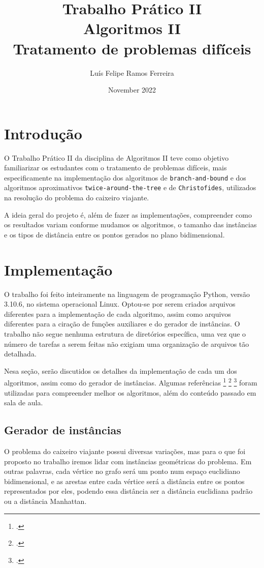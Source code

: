 \documentclass{article}
\author{Luís Felipe Ramos Ferreira }
\title{Trabalho Prático II \\ Algoritmos II \\ Tratamento de problemas difíceis}
\date{November 2022}
\begin{document}
\maketitle

\section{Introdução}

O Trabalho Prático II da disciplina de Algoritmos II teve como objetivo familiarizar os estudantes com o tratamento de problemas difíceis, mais especificamente na implementação dos algoritmos de \texttt{branch-and-bound} e dos algoritmos aproximativos \texttt{twice-around-the-tree} e de \texttt{Christofides}, utilizados na resolução do problema do caixeiro viajante.

A ideia geral do projeto é, além de fazer as implementações, compreender como os resultados variam conforme mudamos os algoritmos, o tamanho das instâncias e os tipos de distância entre os pontos gerados no plano bidimensional.

\section{Implementação}

O trabalho foi feito inteiramente na linguagem de programação Python, versão
3.10.6, no sistema operacional Linux.
Optou-se por serem criados arquivos diferentes para a implementação de cada algoritmo, assim como arquivos diferentes para a ciração de funções auxiliares e do gerador de instâncias. O trabalho não segue nenhuma estrutura de diretórios específica, uma vez que o número de tarefas a serem feitas não exigiam uma organização de arquivos tão detalhada.

Nesa seção, serão discutidos os detalhes da implementação de cada um dos algoritmos, assim como do gerador de instâncias. Algumas referências \footcite{TSP} \footcite{alg} \footcite{youtube} foram utilizadas para compreender melhor os algoritmos, além do conteúdo passado em sala de aula.

\bigskip
\bigskip %

\subsection{Gerador de instâncias}

O problema do caixeiro viajante possui diversas variações, mas para o que foi proposto no trabalho iremos lidar com instâncias geométricas do problema. Em outras palavras, cada vértice no grafo será um ponto num espaço euclidiano bidimensional, e as arestas entre cada vértice será a distância entre os pontos representados por eles, podendo essa distância ser a distância euclidiana padrão ou a distância Manhattan.
\end{document}
